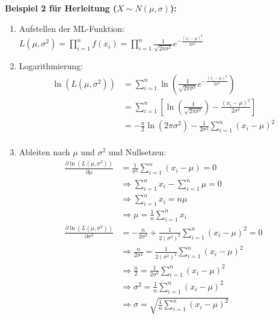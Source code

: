 \textbf{Beispiel 2 für Herleitung (\(X\sim N(\mu, \sigma)\)):}

\begin{enumerate}
    \item Aufstellen der ML-Funktion: \(L(\mu, \sigma^2)=\prod_{i=1}^{n}f(x_i)=\prod_{i=1}^{n}\frac{1}{\sqrt{2\pi\sigma^2}}e^{-\frac{(x_i-\mu)^2}{2\sigma^2}}\)
    \item Logarithmierung:\\
        \begin{equation*}
            \begin{split}
            \ln(L(\mu, \sigma^2))&=\sum_{i=1}^{n}\ln(\frac{1}{\sqrt{2\pi\sigma^2}}e^{-\frac{(x_i-\mu)^2}{2\sigma^2}})\\
            &=\sum_{i=1}^{n}\left [ \ln(\frac{1}{\sqrt{2\pi\sigma^2}})-\frac{(x_i-\mu)^2}{2\sigma^2}\right ]\\
            &=-\frac{n}{2}\ln(2\pi\sigma^2)-\frac{1}{2\sigma^2}\sum_{i=1}^{n}(x_i-\mu)^2\\
            \end{split}
        \end{equation*}
    \item Ableiten nach \(\mu\) und \(\sigma^2\) und Nullsetzen:
        \begin{equation*}
            \begin{split}
            \frac{\partial \ln(L(\mu, \sigma^2))}{\partial \mu}&=\frac{1}{\sigma^2}\sum_{i=1}^{n}(x_i-\mu)=0\\
            &\Rightarrow \sum_{i=1}^{n}x_i-\sum_{i=1}^{n}\mu=0\\
            &\Rightarrow \sum_{i=1}^{n}x_i=n\mu\\
            &\Rightarrow \mu=\frac{1}{n}\sum_{i=1}^{n}x_i\\
            \frac{\partial \ln(L(\mu, \sigma^2))}{\partial \sigma^2}&=-\frac{n}{2\sigma^2}+\frac{1}{2(\sigma^2)^2}\sum_{i=1}^{n}(x_i-\mu)^2=0\\
            &\Rightarrow \frac{n}{2\sigma^2}=\frac{1}{2(\sigma^2)^2}\sum_{i=1}^{n}(x_i-\mu)^2\\
            &\Rightarrow \frac{n}{2}=\frac{1}{2\sigma^2}\sum_{i=1}^{n}(x_i-\mu)^2\\
            &\Rightarrow \sigma^2=\frac{1}{n}\sum_{i=1}^{n}(x_i-\mu)^2\\
            &\Rightarrow \sigma=\sqrt{\frac{1}{n}\sum_{i=1}^{n}(x_i-\mu)^2}\\
            \end{split}
        \end{equation*}
\end{enumerate}
